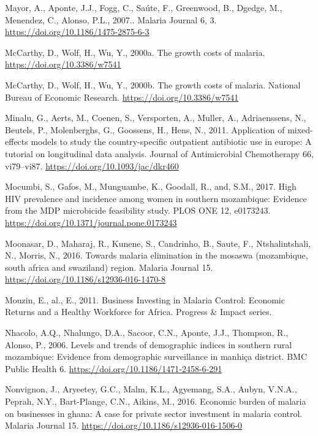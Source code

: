 \documentclass[]{article}
\begin{document}
\hypertarget{ref-Mayor2007}{}
Mayor, A., Aponte, J.J., Fogg, C., Saúte, F., Greenwood, B., Dgedge, M.,
Menendez, C., Alonso, P.L., 2007.. Malaria Journal 6, 3.
\url{https://doi.org/10.1186/1475-2875-6-3}

\hypertarget{ref-McCarthy_2000}{}
McCarthy, D., Wolf, H., Wu, Y., 2000a. The growth costs of malaria.
\url{https://doi.org/10.3386/w7541}

\hypertarget{ref-McCarthy2000}{}
McCarthy, D., Wolf, H., Wu, Y., 2000b. The growth costs of malaria.
National Bureau of Economic Research.
\url{https://doi.org/10.3386/w7541}

\hypertarget{ref-Minalu2011}{}
Minalu, G., Aerts, M., Coenen, S., Versporten, A., Muller, A.,
Adriaenssens, N., Beutels, P., Molenberghs, G., Goossens, H., Hens, N.,
2011. Application of mixed-effects models to study the country-specific
outpatient antibiotic use in europe: A tutorial on longitudinal data
analysis. Journal of Antimicrobial Chemotherapy 66, vi79--vi87.
\url{https://doi.org/10.1093/jac/dkr460}

\hypertarget{ref-Mocumbi2017}{}
Mocumbi, S., Gafos, M., Munguambe, K., Goodall, R., and, S.M., 2017.
High HIV prevalence and incidence among women in southern mozambique:
Evidence from the MDP microbicide feasibility study. PLOS ONE 12,
e0173243. \url{https://doi.org/10.1371/journal.pone.0173243}

\hypertarget{ref-Moonasar_2016}{}
Moonasar, D., Maharaj, R., Kunene, S., Candrinho, B., Saute, F.,
Ntshalintshali, N., Morris, N., 2016. Towards malaria elimination in the
mosaswa (mozambique, south africa and swaziland) region. Malaria Journal
15. \url{https://doi.org/10.1186/s12936-016-1470-8}

\hypertarget{ref-Mouzin2011}{}
Mouzin, E., al., E., 2011. Business Investing in Malaria Control:
Economic Returns and a Healthy Workforce for Africa. Progress \& Impact
series.

\hypertarget{ref-Nhacolo_2006}{}
Nhacolo, A.Q., Nhalungo, D.A., Sacoor, C.N., Aponte, J.J., Thompson, R.,
Alonso, P., 2006. Levels and trends of demographic indices in southern
rural mozambique: Evidence from demographic surveillance in manhiça
district. BMC Public Health 6.
\url{https://doi.org/10.1186/1471-2458-6-291}

\hypertarget{ref-Nonvignon_2016}{}
Nonvignon, J., Aryeetey, G.C., Malm, K.L., Agyemang, S.A., Aubyn,
V.N.A., Peprah, N.Y., Bart-Plange, C.N., Aikins, M., 2016. Economic
burden of malaria on businesses in ghana: A case for private sector
investment in malaria control. Malaria Journal 15.
\url{https://doi.org/10.1186/s12936-016-1506-0}
\end{document}
